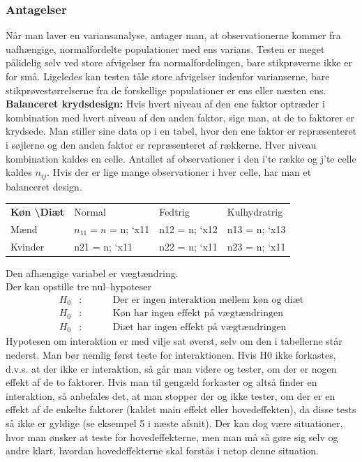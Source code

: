 \documentclass[11pt]{article}
\begin{document}
\subsubsection{Antagelser}
Når man laver en variansanalyse, antager man, at observationerne kommer fra uafhængige, normalfordelte populationer med ens varians. Testen er meget pålidelig selv ved store afvigelser fra normalfordelingen, bare stikprøverne ikke er for små. Ligeledes kan testen tåle store afvigelser indenfor varianserne, bare stikprøvestørrelserne fra de forskellige populationer er ens eller næsten ens.\\[0.2cm]
\textbf{Balanceret krydsdesign:} Hvis hvert niveau af den ene faktor optræder i kombination med hvert niveau af den anden faktor, sige man, at de to faktorer er krydsede. Man stiller sine data op i en tabel, hvor den ene faktor er repræsenteret i søjlerne og den anden faktor er repræsenteret af rækkerne. Hver niveau kombination kaldes en celle. Antallet af observationer i den i'te række og j'te celle kaldes $n_{ij}$. Hvis der er lige mange observationer i hver celle, har man et balanceret design.
\begin{table}[H]
\centering
\begin{tabular}{llll}
\textbf{Køn \textbackslash Diæt} & Normal        & Fedtrig       & Kulhydratrig  \\
Mænd                             & $n_{11}=n$ = n; `x11 & n12 = n; `x12 & n13 = n; `x13 \\
Kvinder                          & n21 = n; `x11 & n22 = n; `x11 & n23 = n; `x11
\end{tabular}
\end{table}
Den afhængige variabel er vægtændring.\\[0.2cm]
Der kan opstille tre nul--hypoteser
\begin{eqnarray*}
H_0&:&\hspace{1cm}\text{Der er ingen interaktion mellem køn og diæt}\\
H_0&:&\hspace{1cm}\text{Køn har ingen effekt på vægtændringen}\\
H_0&:&\hspace{1cm}\text{Diæt har ingen effekt på vægtændringen}
\end{eqnarray*}
Hypotesen om interaktion er med vilje sat øverst, selv om den i tabellerne står nederst. Man bør nemlig først teste for interaktionen. Hvis H0 ikke forkastes, d.v.s. at der ikke er interaktion, så går man videre og tester, om der er nogen effekt af de to faktorer. Hvis man til gengæld forkaster og altså finder en interaktion, så anbefales det, at man stopper der og ikke tester, om der er en effekt af de enkelte faktorer (kaldet main effekt eller hovedeffekten), da disse tests så ikke er gyldige (se eksempel 5 i næste afsnit). Der kan dog være situationer, hvor man ønsker at teste for hovedeffekterne, men man må så gøre sig selv og andre klart, hvordan hovedeffekterne skal forstås i netop denne situation.\\[0.2cm]
\end{document}

